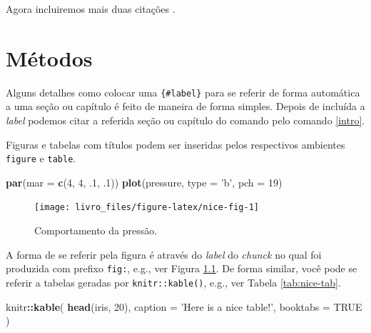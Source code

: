 \documentclass[]{book}
\newenvironment{Shaded}{\begin{snugshade}}{\end{snugshade}}
\newcommand{\KeywordTok}[1]{\textcolor[rgb]{0.13,0.29,0.53}{\textbf{#1}}}
\newcommand{\DataTypeTok}[1]{\textcolor[rgb]{0.13,0.29,0.53}{#1}}
\newcommand{\DecValTok}[1]{\textcolor[rgb]{0.00,0.00,0.81}{#1}}
\newcommand{\StringTok}[1]{\textcolor[rgb]{0.31,0.60,0.02}{#1}}
\newcommand{\OtherTok}[1]{\textcolor[rgb]{0.56,0.35,0.01}{#1}}
\newcommand{\OperatorTok}[1]{\textcolor[rgb]{0.81,0.36,0.00}{\textbf{#1}}}
\newcommand{\NormalTok}[1]{#1}
\begin{document}
Agora incluiremos mais duas citações
\citep[\citet{Williams2020}]{DaSilvaEloy2017}.

\chapter{Métodos}\label{metodos}

Alguns detalhes como colocar uma \texttt{\{\#label\}} para se referir de
forma automática a uma seção ou capítulo é feito de maneira de forma
simples. Depois de incluída a \emph{label} podemos citar a referida
seção ou capítulo do comando pelo comando \ref{intro}.

Figuras e tabelas com títulos podem ser inseridas pelos respectivos
ambientes \texttt{figure} e \texttt{table}.

\begin{Shaded}
\begin{Highlighting}[]
\KeywordTok{par}\NormalTok{(}\DataTypeTok{mar =} \KeywordTok{c}\NormalTok{(}\DecValTok{4}\NormalTok{, }\DecValTok{4}\NormalTok{, .}\DecValTok{1}\NormalTok{, .}\DecValTok{1}\NormalTok{))}
\KeywordTok{plot}\NormalTok{(pressure, }\DataTypeTok{type =} \StringTok{'b'}\NormalTok{, }\DataTypeTok{pch =} \DecValTok{19}\NormalTok{)}
\end{Highlighting}
\end{Shaded}

\begin{figure}

{\centering \texttt{[image: livro\_files/figure-latex/nice-fig-1]} 

}

\caption{Comportamento da pressão.}\label{fig:nice-fig}
\end{figure}

A forma de se referir pela figura é através do \emph{label} do
\emph{chunck} no qual foi produzida com prefixo \texttt{fig:}, e.g., ver
Figura \ref{fig:nice-fig}. De forma similar, você pode se referir a
tabelas geradas por \texttt{knitr::kable()}, e.g., ver Tabela
\ref{tab:nice-tab}.

\begin{Shaded}
\begin{Highlighting}[]
\NormalTok{knitr}\OperatorTok{::}\KeywordTok{kable}\NormalTok{(}
  \KeywordTok{head}\NormalTok{(iris, }\DecValTok{20}\NormalTok{), }\DataTypeTok{caption =} \StringTok{'Here is a nice table!'}\NormalTok{,}
  \DataTypeTok{booktabs =} \OtherTok{TRUE}
\NormalTok{)}
\end{Highlighting}
\end{Shaded}
\end{document}
